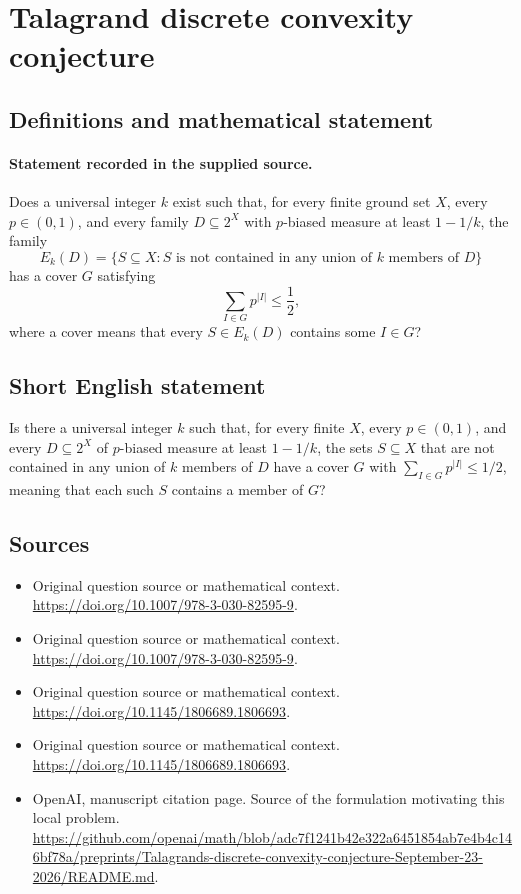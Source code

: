 \documentclass[11pt]{article}
\begin{document}
\section*{Talagrand discrete convexity conjecture}\label{statement}
\subsection{Definitions and mathematical statement}
\paragraph{Statement recorded in the supplied source.}
Does a universal integer $k$ exist such that, for every finite ground set $X$, every $p\in(0,1)$, and every family $D\subseteq 2^X$ with $p$-biased measure at least $1-1/k$, the family
\[
E_k(D)=\{S\subseteq X:S\text{ is not contained in any union of }k\text{ members of }D\}
\]
has a cover $G$ satisfying
\[
\sum_{I\in G}p^{|I|}\leq\frac12,
\]
where a cover means that every $S\in E_k(D)$ contains some $I\in G$?
\subsection{Short English statement}
Is there a universal integer $k$ such that, for every finite $X$, every $p\in(0,1)$, and every $D\subseteq2^X$ of $p$-biased measure at least $1-1/k$, the sets $S\subseteq X$ that are not contained in any union of $k$ members of $D$ have a cover $G$ with $\sum_{I\in G}p^{|I|}\leq1/2$, meaning that each such $S$ contains a member of $G$?
\subsection{Sources}
\begin{itemize}
\item[S1] Original question source or mathematical context.
\url{https://doi.org/10.1007/978-3-030-82595-9}.
\item[S2] Original question source or mathematical context.
\url{https://doi.org/10.1007/978-3-030-82595-9}.
\item[S3] Original question source or mathematical context.
\url{https://doi.org/10.1145/1806689.1806693}.
\item[S4] Original question source or mathematical context.
\url{https://doi.org/10.1145/1806689.1806693}.
\item[S5] OpenAI, manuscript citation page. Source of the formulation motivating this local problem.
\url{https://github.com/openai/math/blob/adc7f1241b42e322a6451854ab7e4b4c146bf78a/preprints/Talagrands-discrete-convexity-conjecture-September-23-2026/README.md}.
\end{itemize}
\end{document}
